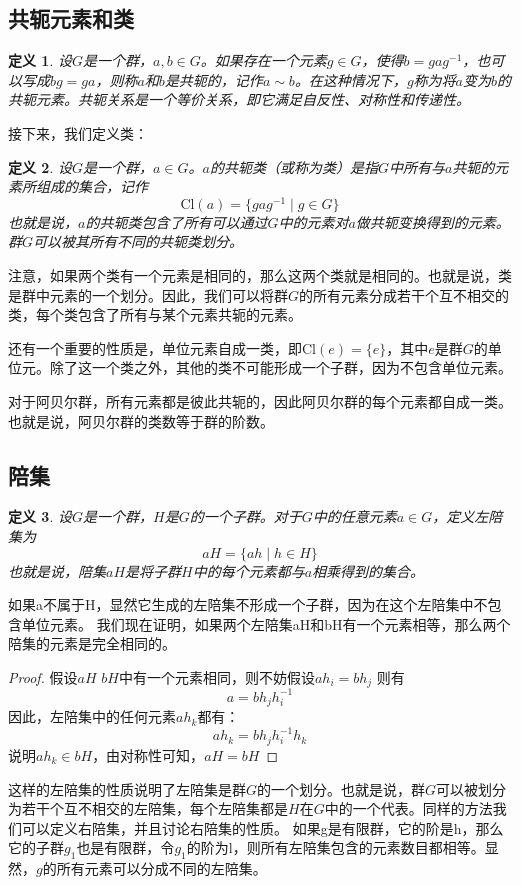 \documentclass{ctexart}%
\newtheorem{definition}{定义}
\begin{document}
\subsection{共轭元素和类}
\begin{definition}
    设$G$是一个群，$a, b \in G$。如果存在一个元素$g \in G$，使得$b = g a g^{-1}$，也可以写成$b g = g a$，则称$a$和$b$是共轭的，记作$a \sim b$。在这种情况下，$g$称为将$a$变为$b$的共轭元素。共轭关系是一个等价关系，即它满足自反性、对称性和传递性。
\end{definition}
接下来，我们定义类：
\begin{definition}
    设$G$是一个群，$a \in G$。$a$的共轭类（或称为类）是指$G$中所有与$a$共轭的元素所组成的集合，记作
    \[
    \mathrm{Cl}(a) = \{g a g^{-1} \mid g \in G\}
    \]
    也就是说，$a$的共轭类包含了所有可以通过$G$中的元素对$a$做共轭变换得到的元素。群$G$可以被其所有不同的共轭类划分。
\end{definition}
注意，如果两个类有一个元素是相同的，那么这两个类就是相同的。也就是说，类是群中元素的一个划分。因此，我们可以将群$G$的所有元素分成若干个互不相交的类，每个类包含了所有与某个元素共轭的元素。

还有一个重要的性质是，单位元素自成一类，即$\mathrm{Cl}(e) = \{e\}$，其中$e$是群$G$的单位元。除了这一个类之外，其他的类不可能形成一个子群，因为不包含单位元素。

对于阿贝尔群，所有元素都是彼此共轭的，因此阿贝尔群的每个元素都自成一类。也就是说，阿贝尔群的类数等于群的阶数。

\subsection{陪集}
\begin{definition}
    设$G$是一个群，$H$是$G$的一个子群。对于$G$中的任意元素$a \in G$，定义左陪集为
    \[
    aH = \{ah \mid h \in H\}
    \]
    也就是说，陪集$aH$是将子群$H$中的每个元素都与$a$相乘得到的集合。
\end{definition}
如果a不属于H，显然它生成的左陪集不形成一个子群，因为在这个左陪集中不包含单位元素。
我们现在证明，如果两个左陪集aH和bH有一个元素相等，那么两个陪集的元素是完全相同的。
\begin{proof}
    假设$aH$ \text{,} $bH$中有一个元素相同，则不妨假设$a h_i = b h_j$
    则有
    \[
    a = bh_jh_i^{-1}
    \]
    因此，左陪集中的任何元素$a h_k$都有：
    \[a h_k = b h_jh_i^{-1}h_k\]
    说明$a h_k \in bH$，由对称性可知，$aH = bH$
\end{proof}
这样的左陪集的性质说明了左陪集是群$G$的一个划分。也就是说，群$G$可以被划分为若干个互不相交的左陪集，每个左陪集都是$H$在$G$中的一个代表。同样的方法我们可以定义右陪集，并且讨论右陪集的性质。
如果g是有限群，它的阶是h，那么它的子群$g_1$也是有限群，令$g_1$的阶为l，则所有左陪集包含的元素数目都相等。显然，$g$的所有元素可以分成不同的左陪集。
\end{document}
